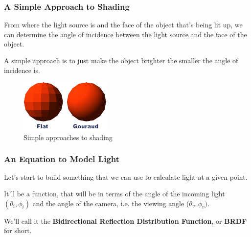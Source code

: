\documentclass[12pt]{beamer}
\begin{document}
  \begin{frame}
    \frametitle{A Simple Approach to Shading} %

    From where the light source is and the face of the object that's being lit up, we can determine the angle of incidence between the light source and the face of the object.

    A simple approach is to just make the object brighter the smaller the angle of incidence is.




    \begin{figure}
      \centering
      \includegraphics[width=0.4\textwidth]{flatvsgouraud.png}
      \caption{Simple approaches to shading}\label{fig:shading}
    \end{figure}

  \end{frame}

  \begin{frame}
    \frametitle{An Equation to Model Light}

    Let's start to build something that we can use to calculate light at a given point.

    \hfill

    It'll be a function, that will be in terms of the angle of the incoming light $(\theta_i, \phi_i)$ and the angle of the camera, i.e. the viewing angle ($\theta_v, \phi_v)$.

    \hfill

    We'll call it the \textbf{Bidirectional Reflection Distribution Function}, or \textbf{BRDF} for short.

  \end{frame}
\end{document}
